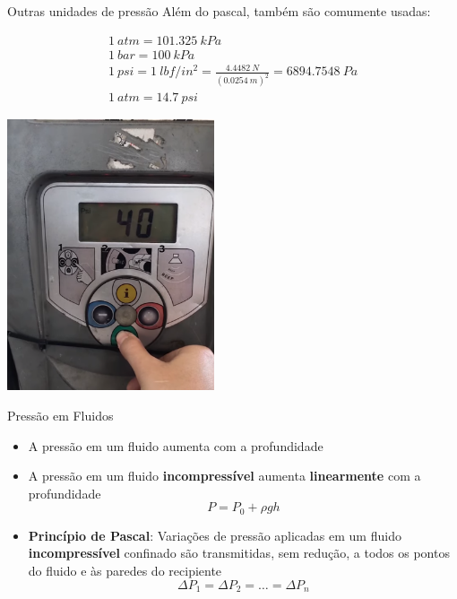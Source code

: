 \begin{frame}{Outras unidades de pressão}
    Além do pascal, também são comumente usadas:
    \begin{fleqn}
        \begin{gather*}
            \SI{1}{atm} = \SI{101.325}{kPa} \\
            \SI{1}{bar} = \SI{100}{kPa} \\
            \SI{1}{psi} = \SI{1}{lbf/in^2} = \frac{\SI{4.4482}{N}}{(\SI{0.0254}{m})^2} =
            \SI{6894.7548}{Pa} \\
            \SI{1}{atm} = \SI{14.7}{psi}
        \end{gather*}
    \end{fleqn}
\end{frame}

\begin{frame}{}
    \begin{center}
        \includegraphics[height=8cm]{images/psi.png}
    \end{center}
\end{frame}

\begin{frame}{Pressão em Fluidos}
    \begin{itemize}
        \item A pressão em um fluido aumenta com a profundidade
        \item A pressão em um fluido \textbf{incompressível} aumenta \textbf{linearmente} com a profundidade
            \[
                P=P_0 + \rho g h
            \]
        \item \textbf{Princípio de Pascal}: Variações de pressão aplicadas em um fluido \textbf{incompressível} confinado são transmitidas, sem redução, a todos os pontos do fluido e às paredes do recipiente
            \[
                \Delta P_1 = \Delta P_2 = \ldots = \Delta P_n
            \]
    \end{itemize}
\end{frame}

